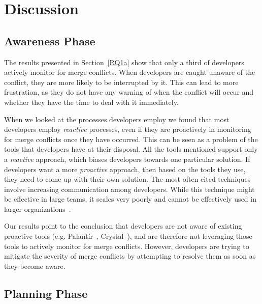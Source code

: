 
\section{Discussion}\label{discussion}

\subsection{Awareness Phase}

The results presented in Section~\ref{RQ1a} show that only a third of developers actively monitor for merge conflicts.
When developers are caught unaware of the conflict, they are more likely to be interrupted by it.
This can lead to more frustration, as they do not have any warning of when the conflict will occur and whether they have the time to deal with it immediately.

When we looked at the processes developers employ we found that most developers employ \emph{reactive} processes, even if they are proactively in monitoring for merge conflicts once they have occurred.
This can be seen as a problem of the tools that developers have at their disposal.
All the tools mentioned support only a \emph{reactive} approach, which biases developers towards one particular solution.
If developers want a more \emph{proactive} approach, then based on the tools they use, they need to come up with their own solution.
The most often cited techniques involve increasing communication among developers.
While this technique might be effective in large teams, it scales very poorly and cannot be effectively used in larger organizations~\cite{brooks1974mythical,steiner1972group}.

Our results point to the conclusion that developers are not aware of existing proactive tools (e.g. Palant\'{i}r~\cite{sarma_palantir:_2003}, Crystal~\cite{Brun2011}), and are therefore not leveraging those tools to actively monitor for merge conflicts.
However, developers are trying to mitigate the severity of merge conflicts by attempting to resolve them as soon as they become aware.

\subsection{Planning Phase}

